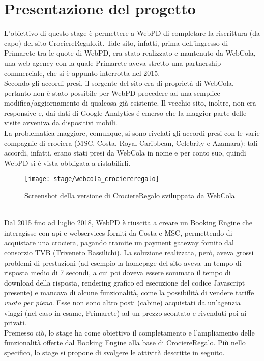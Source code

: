 \section{Presentazione del progetto}
L'obiettivo di questo stage è permettere a WebPD di completare la riscrittura (da capo) del sito CrociereRegalo.it. Tale sito, infatti, prima dell'ingresso di Primarete tra le quote di WebPD, era stato realizzato e mantenuto da WebCola, una web agency con la quale Primarete aveva stretto una partnership commerciale, che si è appunto interrotta nel 2015.\\
Secondo gli accordi presi, il sorgente del sito era di proprietà di WebCola, pertanto non è stato possibile per WebPD procedere ad una semplice modifica/aggiornamento di qualcosa già esistente. Il vecchio sito, inoltre, non era responsive e, dai dati di Google Analytics é emerso che la maggior parte delle visite avveniva da dispositivi mobili. \\
La problematica maggiore, comunque, si sono rivelati gli accordi presi con le varie compagnie di crociera (MSC, Costa, Royal Caribbean, Celebrity e Azamara): tali accordi, infatti, erano stati presi da WebCola in nome e per conto suo, quindi WebPD si è vista obbligata a ristabilirli.
\begin{figure}[!h] 
	\centering 
	\texttt{[image: stage/webcola\_crociereregalo]} 
	\caption{Screenshot della versione di CrociereRegalo sviluppata da WebCola}
\end{figure}\\
Dal 2015 fino ad luglio 2018, WebPD è riuscita a creare un Booking Engine che interagisse con \Gls{api} e \glspl{webservice} forniti da Costa e MSC, permettendo di acquistare una crociera, pagando tramite un payment gateway fornito dal consorzio TVB (Triveneto Bassilichi). La soluzione realizzata, però, aveva grossi problemi di prestazioni (ad esempio la homepage del sito aveva un tempo di risposta medio di 7 secondi, a cui poi doveva essere sommato il tempo di download della risposta, rendering grafico ed esecuzione del codice Javascript presente) e mancava di alcune funzionalità, come la possibilità di vendere tariffe \textit{vuoto per pieno}. Esse non sono altro posti (cabine) acquistati da un'agenzia viaggi (nel caso in esame, Primarete) ad un prezzo scontato e rivenduti poi ai privati.
\\
Premesso ciò, lo stage ha come obiettivo il completamento e l'ampliamento delle funzionalità offerte dal Booking Engine alla base di CrociereRegalo. Più nello specifico, lo stage si propone di svolgere le attività descritte in seguito.

